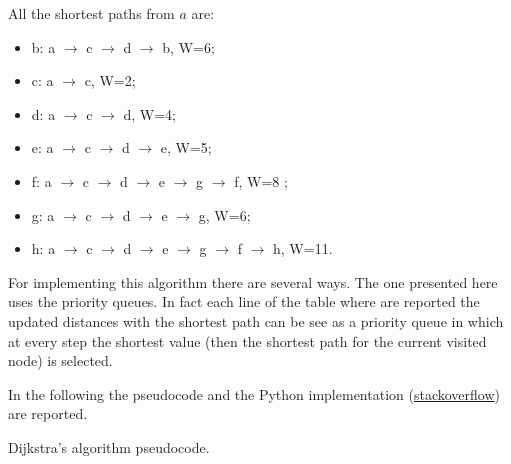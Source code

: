 All the shortest paths from \(a\) are:
\begin{itemize}
\item b: a \(\rightarrow\) c \(\rightarrow\) d \(\rightarrow\) b, W=6;
\item c: a \(\rightarrow\) c, W=2;
\item d: a \(\rightarrow\) c \(\rightarrow\) d, W=4;
\item e: a \(\rightarrow\) c \(\rightarrow\) d \(\rightarrow\) e, W=5;
\item f: a \(\rightarrow\) c \(\rightarrow\) d \(\rightarrow\) e \(\rightarrow\) g \(\rightarrow\) f, W=8 ;
\item g: a \(\rightarrow\) c \(\rightarrow\) d \(\rightarrow\) e \(\rightarrow\) g, W=6;
\item h: a \(\rightarrow\) c \(\rightarrow\) d \(\rightarrow\) e \(\rightarrow\) g \(\rightarrow\) f \(\rightarrow\) h, W=11.
\end{itemize}

For implementing this algorithm there are several ways. The one presented here uses the priority queues. In fact each line of the table where are reported the updated distances with the shortest path can be see as a priority queue in which at every step the shortest value (then the shortest path for the current visited node) is selected.

In the following the pseudocode \cite{wikidijkstra} and the Python implementation \cite{stackdijkstra} (\href{https://stackoverflow.com/a/57234618}{stackoverflow}) are reported.

\begin{algorithm}[H]
	\DontPrintSemicolon
	\LinesNumbered
\caption{Dijkstra's algorithm pseudocode.}
\end{algorithm}

